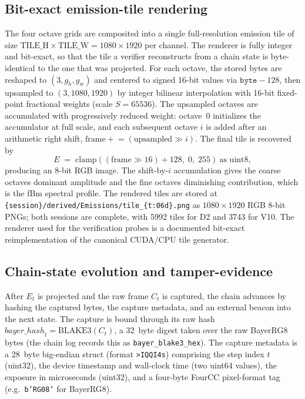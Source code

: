 \subsection{Bit-exact emission-tile rendering}
\label{subsec:pc_render}

The four octave grids are composited into a single full-resolution emission tile of size $\text{TILE\_H}\times\text{TILE\_W} = 1080\times1920$ per channel. The renderer is fully integer and bit-exact, so that the tile a verifier reconstructs from a chain state is byte-identical to the one that was projected. For each octave, the stored bytes are reshaped to $(3, g_h, g_w)$ and centered to signed 16-bit values via $\texttt{byte} - 128$, then upsampled to $(3, 1080, 1920)$ by integer bilinear interpolation with 16-bit fixed-point fractional weights (scale $S = 65536$). The upsampled octaves are accumulated with progressively reduced weight: octave~0 initializes the accumulator at full scale, and each subsequent octave $i$ is added after an arithmetic right shift, $\text{frame} \mathrel{+}= (\text{upsampled} \gg i)$. The final tile is recovered by
\begin{equation}
E \;=\; \mathrm{clamp}\!\left(\left(\text{frame} \gg 16\right) + 128,\; 0,\; 255\right)\ \text{as uint8},
\label{eq:pc_render}
\end{equation}
producing an 8-bit RGB image. The shift-by-$i$ accumulation gives the coarse octaves dominant amplitude and the fine octaves diminishing contribution, which is the fBm spectral profile. The rendered tiles are stored at \texttt{\{session\}/derived/Emissions/tile\_\{t:06d\}.png} as $1080\times1920$ RGB 8-bit PNGs; both sessions are complete, with \num{5992} tiles for D2 and \num{3743} for V10. The renderer used for the verification probes is a documented bit-exact reimplementation of the canonical CUDA/CPU tile generator.

\subsection{Chain-state evolution and tamper-evidence}
\label{subsec:pc_chain}

After $E_t$ is projected and the raw frame $C_t$ is captured, the chain advances by hashing the captured bytes, the capture metadata, and an external beacon into the next state. The capture is bound through its raw hash $\mathit{bayer\_hash}_t = \mathrm{BLAKE3}(C_t)$, a \SI{32}{byte} digest taken over the raw BayerRG8 bytes (the chain log records this as \texttt{bayer\_blake3\_hex}). The capture metadata is a \SI{28}{byte} big-endian struct (format \texttt{>IQQI4s}) comprising the step index $t$ (uint32), the device timestamp and wall-clock time (two uint64 values), the exposure in microseconds (uint32), and a four-byte FourCC pixel-format tag (e.g.\ \texttt{b'RG08'} for BayerRG8).

